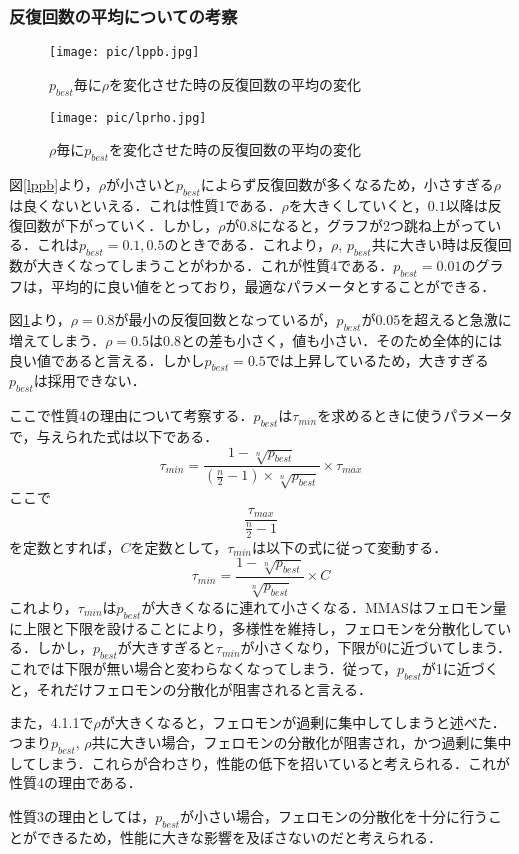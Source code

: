 \documentclass[a4j]{jsarticle}
\begin{document}
\subsubsection{反復回数の平均についての考察}
\begin{figure}[htb]
 \begin{minipage}{0.5\hsize}
  \begin{center}
   \texttt{[image: pic/lppb.jpg]}
  \end{center}
  \caption{$p_{best}$毎に$\rho$を変化させた時の反復回数の平均の変化}
  \label{lppb}
 \end{minipage}
 \begin{minipage}{0.5\hsize}
  \begin{center}
   \texttt{[image: pic/lprho.jpg]}
  \end{center}
  \caption{$\rho$毎に$p_{best}$を変化させた時の反復回数の平均の変化}
  \label{lprho}
 \end{minipage}
\end{figure}

図\ref{lppb}より，$\rho$が小さいと$p_{best}$によらず反復回数が多くなるため，小さすぎる$\rho$は良くないといえる．これは性質1である．$\rho$を大きくしていくと，$0.1$以降は反復回数が下がっていく．しかし，$\rho$が$0.8$になると，グラフが2つ跳ね上がっている．これは$p_{best} = 0.1, 0.5$のときである．これより，$\rho$, $p_{best}$共に大きい時は反復回数が大きくなってしまうことがわかる．これが性質4である．$p_{best} = 0.01$のグラフは，平均的に良い値をとっており，最適なパラメータとすることができる．
\par
図\ref{lprho}より，$\rho = 0.8$が最小の反復回数となっているが，$p_{best}$が$0.05$を超えると急激に増えてしまう．$\rho = 0.5$は$0.8$との差も小さく，値も小さい．そのため全体的には良い値であると言える．しかし$p_{best} = 0.5$では上昇しているため，大きすぎる$p_{best}$は採用できない．
\par
ここで性質4の理由について考察する．$p_{best}$は$\tau_{min}$を求めるときに使うパラメータで，与えられた式は以下である．
$$
\tau_{min} = \frac{1 - \sqrt[n]{p_{best}}}{(\frac{n}{2}-1)\times\sqrt[n]{p_{best}}}\times\tau_{max}
$$
ここで
$$
\frac{\tau_{max}}{\frac{n}{2}-1}
$$
を定数とすれば，$C$を定数として，$\tau_{min}$は以下の式に従って変動する．
$$
\tau_{min} = \frac{1 - \sqrt[n]{p_{best}}}{\sqrt[n]{p_{best}}}\times C
$$
これより，$\tau_{min}$は$p_{best}$が大きくなるに連れて小さくなる．MMASはフェロモン量に上限と下限を設けることにより，多様性を維持し，フェロモンを分散化している．しかし，$p_{best}$が大きすぎると$\tau_{min}$が小さくなり，下限が0に近づいてしまう．これでは下限が無い場合と変わらなくなってしまう．従って，$p_{best}$が1に近づくと，それだけフェロモンの分散化が阻害されると言える．
\par
また，4.1.1で$\rho$が大きくなると，フェロモンが過剰に集中してしまうと述べた．つまり$p_{best}$, $\rho$共に大きい場合，フェロモンの分散化が阻害され，かつ過剰に集中してしまう．これらが合わさり，性能の低下を招いていると考えられる．これが性質4の理由である．
\par
性質3の理由としては，$p_{best}$が小さい場合，フェロモンの分散化を十分に行うことができるため，性能に大きな影響を及ぼさないのだと考えられる．
\end{document}
